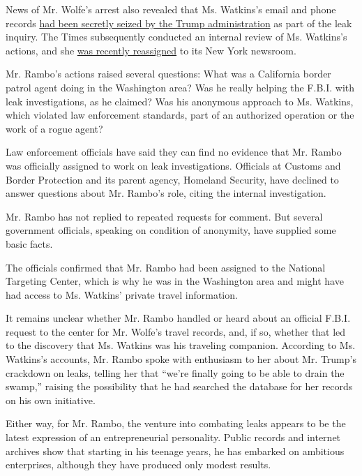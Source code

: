 News of Mr. Wolfe's arrest also revealed that Ms. Watkins's email and
phone records
\href{https://www.nytimes3xbfgragh.onion/2018/06/24/business/media/james-wolfe-ali-watkins-leaks-reporter.html}{had
been secretly seized by the Trump administration} as part of the leak
inquiry. The Times subsequently conducted an internal review of Ms.
Watkins's actions, and she
\href{https://www.nytimes3xbfgragh.onion/2018/07/03/business/media/ali-watkins-times-reporter-memo.html}{was
recently reassigned} to its New York newsroom.

Mr. Rambo's actions raised several questions: What was a California
border patrol agent doing in the Washington area? Was he really helping
the F.B.I. with leak investigations, as he claimed? Was his anonymous
approach to Ms. Watkins, which violated law enforcement standards, part
of an authorized operation or the work of a rogue agent?

Law enforcement officials have said they can find no evidence that Mr.
Rambo was officially assigned to work on leak investigations. Officials
at Customs and Border Protection and its parent agency, Homeland
Security, have declined to answer questions about Mr. Rambo's role,
citing the internal investigation.

Mr. Rambo has not replied to repeated requests for comment. But several
government officials, speaking on condition of anonymity, have supplied
some basic facts.

The officials confirmed that Mr. Rambo had been assigned to the National
Targeting Center, which is why he was in the Washington area and might
have had access to Ms. Watkins' private travel information.

It remains unclear whether Mr. Rambo handled or heard about an official
F.B.I. request to the center for Mr. Wolfe's travel records, and, if so,
whether that led to the discovery that Ms. Watkins was his traveling
companion. According to Ms. Watkins's accounts, Mr. Rambo spoke with
enthusiasm to her about Mr. Trump's crackdown on leaks, telling her that
``we're finally going to be able to drain the swamp,'' raising the
possibility that he had searched the database for her records on his own
initiative.

Either way, for Mr. Rambo, the venture into combating leaks appears to
be the latest expression of an entrepreneurial personality. Public
records and internet archives show that starting in his teenage years,
he has embarked on ambitious enterprises, although they have produced
only modest results.

